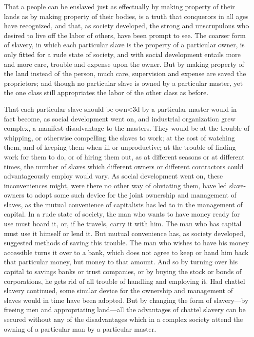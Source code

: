 \documentclass{book}
\begin{document}
That a people can be enslaved just as effectually by making property of their lands as by making property of their bodies, is a truth that conquerors in all ages have recognized, and that, as society developed, the strong and unscrupulous who desired to live off the labor of others, have been prompt to see. The coarser form of slavery, in which each particular slave is the property of a particular owner, is only fitted for a rude state of society, and with social development entails more and more care, trouble and expense upon the owner. But by making property of the land instead of the person, much care, supervision and expense are saved the proprietors; and though no particular slave is owned by a particular master, yet the one class still appropriates the labor of the other class as before.

That each particular slave should be own<3d by a particular master would in fact become, as social development went on, and industrial organization grew complex, a manifest disadvantage to the masters. They would be at the trouble of whipping, or otherwise compelling the slaves to work; at the cost of watching them, and of keeping them when ill or unproductive; at the trouble of finding work for them to do, or of hiring them out, as at different seasons or at different times, the number of slaves which different owners or different contractors could advantageously employ would vary. As social development went on, these inconveniences might, were there no other way of obviating them, have led slave-owners to adopt some such device for the joint ownership and management of slaves, as the mutual convenience of capitalists has led to in the management of capital. In a rude state of society, the man who wants to have money ready for use must hoard it, or, if he travels, carry it with him. The man who has capital must use it himself or lend it. But mutual convenience has, as society developed, suggested methods of saving this trouble. The man who wishes to have his money accessible turns it over to a bank, which does not agree to keep or hand him back that particular money, but money to that amount. And so by turning over his capital to savings banks or trust companies, or by buying the stock or bonds of corporations, he gets rid of all trouble of handling and employing it. Had chattel slavery continued, some similar device for the ownership and management of slaves would in time have been adopted. But by changing the form of slavery—by freeing men and appropriating land—all the advantages of chattel slavery can be secured without any of the disadvantages which in a complex society attend the owning of a particular man by a particular master.
\end{document}
